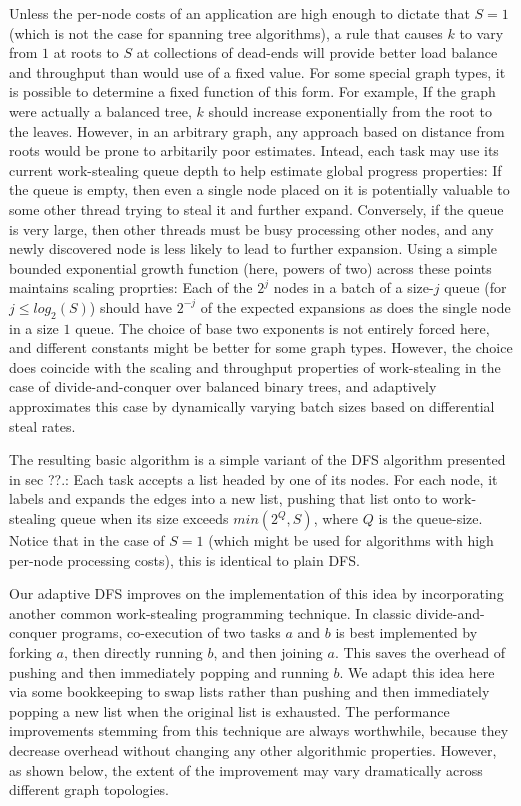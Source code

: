Unless the per-node costs of an application are high enough to dictate
that $S=1$ (which is not the case for spanning tree algorithms), a rule
that causes $k$ to vary from $1$ at roots to $S$ at collections of dead-ends
will provide better load balance and throughput than would use of a
fixed value. For some special graph types, it is possible to determine
a fixed function of this form. For example, If the graph were actually
a balanced tree, $k$ should increase exponentially from the root to the
leaves. However, in an arbitrary graph, any approach based on distance
from roots would be prone to arbitarily poor estimates.  Intead, each
task may use its current work-stealing queue depth to help estimate
global progress properties: If the queue is empty, then even a single
node placed on it is potentially valuable to some other thread trying
to steal it and further expand.  Conversely, if the queue is very
large, then other threads must be busy processing other nodes, and any
newly discovered node is less likely to lead to further expansion.
Using a simple bounded exponential growth function (here, powers of
two) across these points maintains scaling proprties: Each of the 
$2^j$ nodes in a batch of a size-$j$ queue (for $j \leq log_2(S)$) should have
$2^{-j}$ of the expected expansions as does the single node in a size $1$
queue. The choice of base two exponents is not entirely forced here,
and different constants might be better for some graph types.
However, the choice does coincide with the scaling and throughput
properties of work-stealing in the case of divide-and-conquer over
balanced binary trees, and adaptively approximates this case by
dynamically varying batch sizes based on differential steal rates.

The resulting basic algorithm is a simple variant of the DFS algorithm
presented in sec ??.: Each task accepts a list headed by one of its
nodes.  For each node, it labels and expands the edges into a new
list, pushing that list onto to work-stealing queue when its size
exceeds $min(2^{Q}, S)$, where $Q$ is the queue-size. Notice that in
the case of $S=1$ (which might be used for algorithms with high
per-node processing costs), this is identical to plain DFS.

Our adaptive DFS improves on the implementation of this idea by
incorporating another common work-stealing programming technique. In
classic divide-and-conquer programs, co-execution of two tasks $a$ and $b$
is best implemented by forking $a$, then directly running $b$, and then
joining $a$.  This saves the overhead of pushing and then immediately
popping and running $b$.  We adapt this idea here via some bookkeeping
to swap lists rather than pushing and then immediately popping a new
list when the original list is exhausted. The performance improvements
stemming from this technique are always worthwhile, because they
decrease overhead without changing any other algorithmic
properties. However, as shown below, the extent of the improvement may
vary dramatically across different graph topologies.

